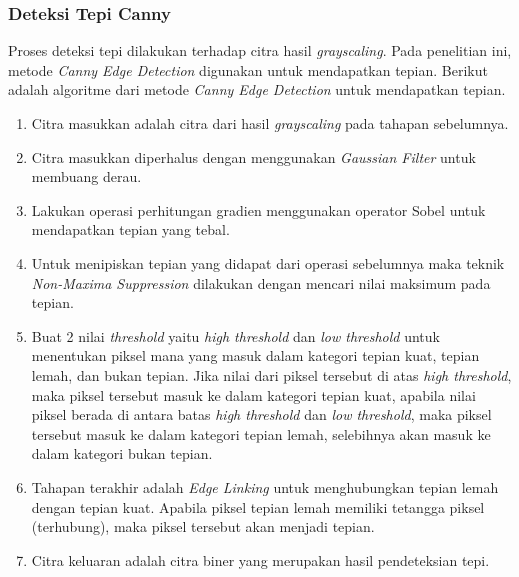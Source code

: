 \subsubsection{Deteksi Tepi Canny}
\noindent Proses deteksi tepi dilakukan terhadap citra hasil \textit{grayscaling}. Pada penelitian ini, metode \textit{Canny Edge Detection} digunakan untuk mendapatkan tepian. Berikut adalah algoritme dari metode \textit{Canny Edge Detection} untuk mendapatkan tepian.
\begin{enumerate}[leftmargin=16pt]
	\item Citra masukkan adalah citra dari hasil \textit{grayscaling} pada tahapan sebelumnya.
	\item Citra masukkan diperhalus dengan menggunakan \textit{Gaussian Filter} untuk membuang derau.
	\item Lakukan operasi perhitungan gradien menggunakan operator Sobel untuk mendapatkan tepian yang tebal.
	\item Untuk menipiskan tepian yang didapat dari operasi sebelumnya maka teknik \textit{Non-Maxima Suppression} dilakukan dengan mencari nilai maksimum pada tepian.
	\item Buat 2 nilai \textit{threshold} yaitu \textit{high threshold} dan \textit{low threshold} untuk menentukan piksel mana yang masuk dalam kategori tepian kuat, tepian lemah, dan bukan tepian. Jika nilai dari piksel tersebut di atas \textit{high threshold}, maka piksel tersebut masuk ke dalam kategori tepian kuat, apabila nilai piksel berada di antara batas \textit{high threshold} dan \textit{low threshold}, maka piksel tersebut masuk ke dalam kategori tepian lemah, selebihnya akan masuk ke dalam kategori bukan tepian.
	\item Tahapan terakhir adalah \textit{Edge Linking} untuk menghubungkan tepian lemah dengan tepian kuat. Apabila piksel tepian lemah memiliki tetangga piksel (terhubung), maka piksel tersebut akan menjadi tepian.
	\item Citra keluaran adalah citra biner yang merupakan hasil pendeteksian tepi.
	\begin{adjustbox}{width=1\textwidth}
		\noindent
		\begin{minipage}{\linewidth}

\end{minipage}
\end{adjustbox}
\end{enumerate}
